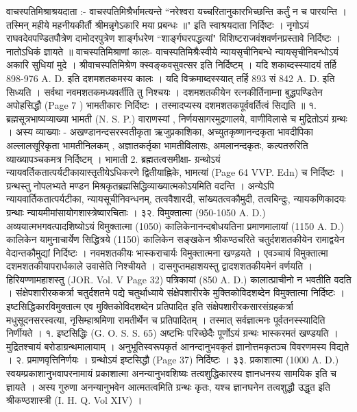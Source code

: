वाचस्पतिमिश्राश्रयदाता :-
वाचस्पतिमिश्रैर्भामत्यन्ते ``नरेश्वरा यच्चरितानुकारभिच्छन्ति कर्तुं न च पारयन्ति । तस्मिन् महीये महनीयकीर्तौ श्रीमन्नृगेऽकारि मया प्रबन्धः ॥" इति स्वाश्रयदाता निर्दिष्टः । नृगोऽयं राघवदेवपण्डितपौत्रेण दामोदरपुत्रेण शार्ङ्गधरेण ``शार्ङ्गघरपद्धत्यां" विशिष्टराजवंशवर्णनप्रस्तावे निर्दिष्टः । नातोऽधिकं ज्ञायते ॥
वाचस्पतिमिश्राणां कालः-
वाचस्पतिमिश्रैःस्वीये न्यायसृचीनिबन्धे न्यायसृचीनिबन्धोऽयं अकारि सुधियां मुदे । श्रीवाचस्पतिमिश्रेण क्स्वङ्कवसुवत्सर इति निर्दिष्टम् । यदि शकाब्दस्स्यादयं तर्हि 898-976 A. D. इति दशमशतकमस्य कालः । यदि विक्रमाब्दस्स्यात् तर्हि 893 सं 842 A. D. इति  सिध्यति । सर्वथा नवमशतकमध्यवर्तीति तु निश्चयः । दशमशतकीयेन रत्नकीर्तिनाम्ना बुद्धपण्डितेन अपोहसिद्धौ (Page 7 ) भामतीकारः निर्दिष्टः । तस्मादप्यस्य दशमशतकपूर्ववर्तित्वं सिद्यति ॥
१. ब्रह्मसूत्रभाष्यव्याख्या भामती (N. S. P.)
वाराणस्यां , निर्णयसागरमुद्रणालये, वाणीविलासे च मुद्रितोऽयं ग्रन्थः । अस्य व्याख्याः - अखण्डानन्दसरस्वतीकृता ऋजुप्रकाशिका, अच्युतकृष्णानन्दकृता भावदीपिका अल्लालसूरिकृता भामतीनिलकम् , अज्ञातकर्तृका भामतीविलासः, अमलानन्दकृतः, कल्पतरुरिति व्याख्यापञ्चकमत्र निर्दिष्टम् ।
भामाती
2. ब्रह्मतत्वसमीक्षा-
ग्रन्थोऽयं न्यायवर्तिकतात्पर्यटीकायास्तृतीयेऽधिकरणे द्वितीयाह्निके, भामत्यां (Page 64 VVP. Edn) च निर्दिष्टः । ग्रन्थस्तु नोपलभ्यते मण्डन मिश्रकृतब्रह्मसिद्धिव्याख्यात्मकोऽयमिति वदन्ति ।
अन्येऽपि न्यायवार्तिकतात्पर्यटीका, न्यायसूचीनिवन्धनम्, तत्ववैशारदी, सांख्यतत्वकौमुदी, तत्वबिन्दुः, न्यायकणिकादयः ग्रन्थाः न्यायमीमांसायोगशास्त्रेष्वारचिताः ।
३२. विमुक्तात्मा (950-1050 A. D.)
अव्ययात्मभगवत्पादशिष्योऽयं विमुक्तात्मा (1050) कालिकेनानन्दबोधयतिना प्रमाणमालायां (1150 A. D.) कालिकेन यामुनाचार्येण सिद्धित्रये (1150) कालिकेन सङ्खकेन श्रीकण्ठचरिते चतुर्दशशतकीयेन रामाद्वयेन वेदान्तकौमुद्यां निर्दिष्टः । नवमशतकीयः भास्कराचार्यः विमुक्तात्मना खण्ड़यते । एवञ्चायं विमुक्तात्मा दशमशतकीयापरार्धकाले उवासेति निश्चीयते । दासगुप्तमहाशयस्तु द्वादशशतकीयमेनं वर्णयति । हिरियण्णामहाशस्तु (JOR. Vol. V Page 32) पत्रिकायां (850 A. D.) कालात्प्राचीनो न भवतीति वदति ।
संक्षेपशारीरककर्त्रा चतुर्दशतमे पद्ये चतुर्थाध्याये संक्षेपशारीरके मुक्तिकोविदशब्देन विमुक्तात्मा निर्दिष्टः । इष्टसिद्धिकारविमुक्तात्म एव मुक्तिकोविदशब्देन प्रतिपादित इति संक्षेपशारीरकसारसंग्रहकर्त्रा मधुसूदनसरस्वत्या, नृसिम्हाश्रमिणा रामतीर्थेन च प्रतिपादितम् । तस्मात् सर्वज्ञात्मनः पूर्वतनस्स्यादिति निर्णीयते ।
१. इष्टसिद्धिः (G. O. S. S. 65)
अष्टभिः परिच्छेदैः पूर्णोऽयं ग्रन्थः भास्करमतं खण्डयति । मुद्रितश्चायं बरोडाग्रन्थमालायाम् । अनुभूतिस्वरूपकृतं आनन्दानुभवकृतं ज्ञानोत्तमकृतञ्च विवरणमस्य विद्यते ।
२. प्रमाणवृत्तिनिर्णयः ।
ग्रन्थोऽयं इष्टसिद्धौ (Page 37) निर्दिष्टः ।
३३. प्रकाशात्मा (1000 A. D.)
स्वयम्प्रकाशानुभवापरनामायं प्रकाशात्मा अनन्यानुभवशिष्यः तत्वशुद्धिकारस्य ज्ञानधनस्य सामयिक इति च ज्ञायते । अस्य गुरुणा अनन्यानुभवेन आत्मतत्वमिति ग्रन्थः कृतः, यश्च ज्ञानघनेन तत्वशुद्धौ उद्धृत इति श्रीकण्ठशास्त्री (I. H. Q. Vol XIV) ।
